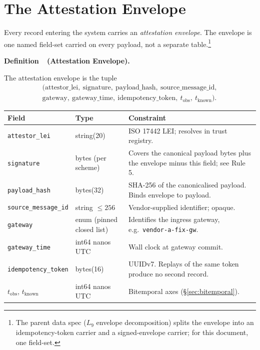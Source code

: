 \documentclass[11pt,a4paper]{article}
\newcounter{defn}
\newenvironment{defn}[1]{%
  \refstepcounter{defn}\par\medskip\noindent\textbf{Definition~\thedefn\ (#1).}\ \itshape%
}{\par\medskip}
\newcounter{rul}
\begin{document}
\section{The Attestation Envelope}\label{sec:envelope}

Every record entering the system carries an \emph{attestation envelope}. The envelope is one named field-set carried on every payload, not a separate table.\footnote{The parent data spec ($L_9$ envelope decomposition) splits the envelope into an idempotency-token carrier and a signed-envelope carrier; for this document, one field-set.}

\begin{defn}{Attestation Envelope}
The attestation envelope is the tuple
\begin{multline*}
(\text{attestor\_lei},\ \text{signature},\ \text{payload\_hash},\ \text{source\_message\_id},\\
 \text{gateway},\ \text{gateway\_time},\ \text{idempotency\_token},\ t_{\text{obs}},\ t_{\text{known}}).
\end{multline*}
\end{defn}

\begin{footnotesize}
\renewcommand{\arraystretch}{1.05}
\begin{center}
\begin{tabular}{@{}p{3.0cm}p{4.5cm}p{8.0cm}@{}}
\toprule
\textbf{Field} & \textbf{Type} & \textbf{Constraint} \\
\midrule
\texttt{attestor\_lei}     & string(20)            & ISO 17442 LEI; resolves in trust registry. \\
\texttt{signature}         & bytes (per scheme)    & Covers the canonical payload bytes plus the envelope minus this field; see Rule 5. \\
\texttt{payload\_hash}     & bytes(32)             & SHA-256 of the canonicalised payload. Binds envelope to payload. \\
\texttt{source\_message\_id} & string $\le 256$    & Vendor-supplied identifier; opaque. \\
\texttt{gateway}           & enum (pinned closed list) & Identifies the ingress gateway, e.g.\ \texttt{vendor-a-fix-gw}. \\
\texttt{gateway\_time}     & int64 nanos UTC       & Wall clock at gateway commit. \\
\texttt{idempotency\_token} & bytes(16)            & UUIDv7. Replays of the same token produce no second record. \\
$t_{\text{obs}}$, $t_{\text{known}}$ & int64 nanos UTC & Bitemporal axes (\S\ref{sec:bitemporal}). \\
\bottomrule
\end{tabular}
\end{center}
\end{footnotesize}
\end{document}
